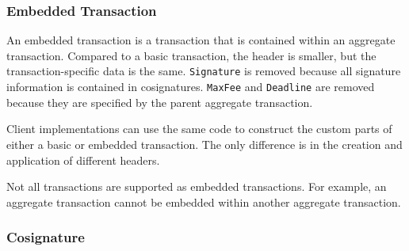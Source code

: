 \subsubsection{Embedded Transaction}

An embedded transaction is a transaction that is contained within an aggregate transaction.
Compared to a basic transaction, the header is smaller, but the transaction-specific data is the same.
\texttt{Signature} is removed because all signature information is contained in cosignatures.
\texttt{MaxFee} and \texttt{Deadline} are removed because they are specified by the parent aggregate transaction.

Client implementations can use the same code to construct the custom parts of either a basic or embedded transaction.
The only difference is in the creation and application of different headers.

Not all transactions are supported as embedded transactions.
For example, an aggregate transaction cannot be embedded within another aggregate transaction.

\begin{figure}[H]
\end{figure}

\subsubsection{Cosignature}

